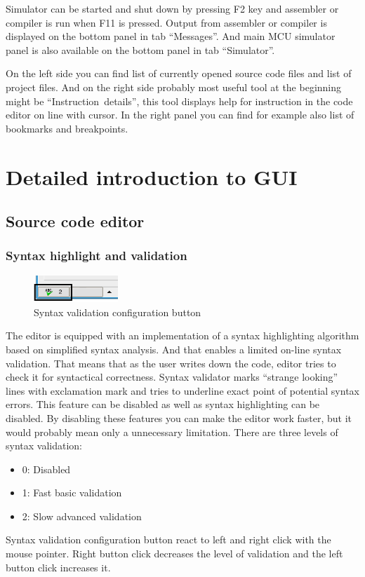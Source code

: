 \documentclass[a4paper,twoside,12pt]{book}
\begin{document}
		Simulator can be started and shut down by pressing F2 key and assembler or compiler is run when F11 is pressed. Output from assembler or compiler is displayed on the bottom panel in tab ``Messages''. And main MCU simulator panel is also available on the bottom panel in tab ``Simulator''.

		On the left side you can find list of currently opened source code files and list of project files. And on the right side probably most useful tool at the beginning might be ``Instruction~details'', this tool displays help for instruction in the code editor on line with cursor. In the right panel you can find for example also list of bookmarks and breakpoints.

\chapter{Detailed introduction to GUI}
	\section{Source code editor}
		\subsection{Syntax highlight and validation}
			\begin{figure}
				\centering{}
				\includegraphics[width=90pt]{img/036.png}
				\caption{Syntax validation configuration button}
			\end{figure}
			The editor is equipped with an implementation of a syntax highlighting algorithm based on simplified syntax analysis. And that enables a limited on-line syntax validation. That means that as the user writes down the code, editor tries to check it for syntactical correctness. Syntax validator marks ``strange looking'' lines with exclamation mark and tries to underline exact point of potential syntax errors. This feature can be disabled as well as syntax highlighting can be disabled. By disabling these features you can make the editor work faster, but it would probably mean only a unnecessary limitation.
			There are three levels of syntax validation:\\
			\begin{itemize}
				\item 0: Disabled
				\item 1: Fast basic validation
				\item 2: Slow advanced validation
			\end{itemize}
			Syntax validation configuration button react to left and right click with the mouse pointer. Right button click decreases the level of validation and the left button click increases it.
\end{document}
